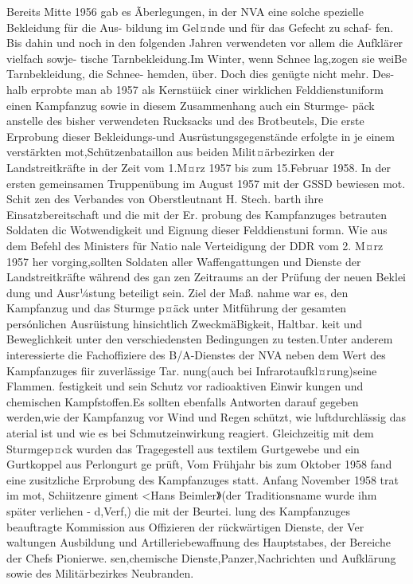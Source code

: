 Bereits Mitte 1956 gab es Ãberlegungen, in der
NVA eine solche spezielle Bekleidung für die Aus-
bildung im Gel¤nde und für das Gefecht zu schaf-
fen. Bis dahin und noch in den folgenden Jahren
verwendeten vor allem die Aufklärer vielfach sowje-
tische Tarnbekleidung.Im Winter, wenn Schnee
lag,zogen sie weiBe Tarnbekleidung, die Schnee-
hemden, über. Doch dies genügte nicht mehr. Des-
halb erprobte man ab 1957 als Kernstüick ciner
wirklichen Felddienstuniform einen Kampfanzug
sowie in diesem Zusammenhang auch ein Sturmge-
päck anstelle des bisher verwendeten Rucksacks
und des Brotbeutels, Die erste Erprobung dieser Bekleidungs-und Ausrüstungsgegenstände erfolgte
in je einem verstärkten mot,Schützenbataillon aus
beiden Milit¤ärbezirken der Landstreitkräfte in der
Zeit vom 1.M¤rz 1957 bis zum 15.Februar 1958.
In der ersten gemeinsamen Truppenübung im
August 1957 mit der GSSD bewiesen mot. Schit
zen des Verbandes von Oberstleutnant H. Stech.
barth ihre Einsatzbereitschaft und die mit der Er.
probung des Kampfanzuges betrauten Soldaten dic
Wotwendigkeit und Eignung dieser Felddienstuni
formn. Wie aus dem Befehl des Ministers für Natio
nale Verteidigung der DDR vom 2. M¤rz 1957 her
vorging,sollten Soldaten aller Waffengattungen
und Dienste der Landstreitkräfte während des gan
zen Zeitraums an der Prüfung der neuen Beklei
dung und Ausr¼stung beteiligt sein. Ziel der Maß.
nahme war es, den Kampfanzug und das Sturmge
p¤äck unter Mitführung der gesamten persónlichen
Ausrüistung hinsichtlich ZweckmäBigkeit, Haltbar.
keit und Beweglichkeit unter den verschiedensten
Bedingungen zu testen.Unter anderem interessierte
die Fachoffiziere des B/A-Dienstes der NVA neben
dem Wert des Kampfanzuges fiir zuverlässige Tar.
nung(auch bei Infrarotaufkl¤rung)seine Flammen.
festigkeit und sein Schutz vor radioaktiven Einwir
kungen und chemischen Kampfstoffen.Es sollten
ebenfalls Antworten darauf gegeben werden,wie
der Kampfanzug vor Wind und Regen schützt, wie
luftdurchlässig das aterial ist und wie es bei
Schmutzeinwirkung reagiert. Gleichzeitig mit dem
Sturmgep¤ck wurden das Tragegestell aus textilem
Gurtgewebe und ein Gurtkoppel aus Perlongurt ge
prüft, Vom Frühjahr bis zum Oktober 1958 fand
eine zusitzliche Erprobung des Kampfanzuges
statt.
Anfang November 1958 trat im mot, Schiitzenre
giment <Hans Beimler》(der Traditionsname wurde
ihm später verliehen - d,Verf,) die mit der Beurtei.
lung des Kampfanzuges beauftragte Kommission
aus Offizieren der rückwärtigen Dienste, der Ver
waltungen Ausbildung und Artilleriebewaffnung
des Hauptstabes, der Bereiche der Chefs Pionierwe.
sen,chemische Dienste,Panzer,Nachrichten und Aufklärung sowie des Militärbezirkes Neubranden.
